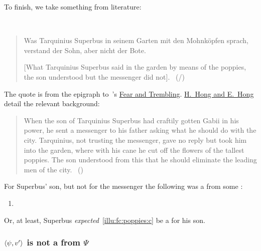 \begin{note}[Poppies]
  To finish, we take something from literature:

  \begin{scenario}[Poppies]
    \label{illu:fc:poppies}
    \mbox{ }
    \vspace{-\baselineskip}
    \begin{quote}
      Was Tarquinius Superbus in seinem Garten mit den Mohnköpfen sprach, verstand der Sohn, aber nicht der Bote.

      [What Tarquinius Superbus said in the garden by means of the poppies, the son understood but the messenger did not].\newline
      \mbox{ }\hfill\mbox{(\cite[3]{Kierkegaard:1983ta}/\cite[190]{Hamann:1822vp})}
  \end{quote}
  \vspace{-\baselineskip}
  \end{scenario}

  \noindent The quote is from the epigraph to~\citeauthor{Kierkegaard:1983ta}'s \hyperlink{cite.Kierkegaard:1983ta}{Fear and Trembling}.
  \hyperlink{cite.Kierkegaard:1983ta}{H.\ Hong and E.\ Hong} detail the relevant background:

  \begin{quote}
    When the son of Tarquinius Superbus had craftily gotten Gabii in his power, he sent a messenger to his father asking what he should do with the city.
    Tarquinius, not trusting the messenger, gave no reply but took him into the garden, where with his cane he cut off the flowers of the tallest poppies.
    The son understood from this that he should eliminate the leading men of the city.%
    \mbox{ }\hfill\mbox{(\citeyear[339]{Kierkegaard:1983ta})}
  \end{quote}

  \noindent For Superbus' son, but not for the messenger the following was a \fc{} from some \pool{}:

  \begin{enumerate}[label=C\thescenarioCounter., ref=(C\thescenarioCounter)]
  \item
    \label{illu:fc:poppies:c}
  \end{enumerate}

  \noindent Or, at least, Superbus \emph{expected}~\ref{illu:fc:poppies:c} be a \fc{} for his son.
\end{note}

\subsubsection*{\(\langle \psi, v' \rangle\) is not a  from \(\Psi\)}
\label{cha:fcs:illu:no}

